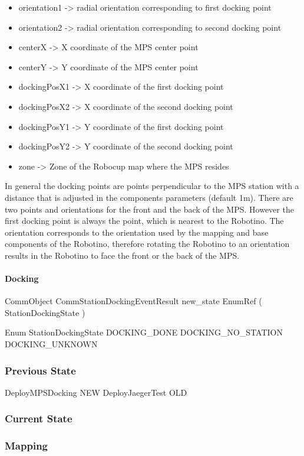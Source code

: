 \begin{itemize}
\item orientation1 -> radial orientation corresponding to first docking point
\item orientation2 -> radial orientation corresponding to second docking point
\item centerX -> X coordinate of the MPS center point
\item centerY -> Y coordinate of the MPS center point
\item dockingPosX1 -> X coordinate of the first docking point
\item dockingPosX2 -> X coordinate of the second docking point
\item dockingPosY1 -> Y coordinate of the first docking point
\item dockingPosY2 -> Y coordinate of the second docking point
\item zone -> Zone of the Robocup map where the MPS resides
\end{itemize}

In general the docking points are points perpendicular to the MPS station with a distance that is adjusted in the components parameters (default 1m). There are two points and orientations for the front and the back of the MPS. However the first docking point is always the point, which is nearest to the Robotino. The orientation corresponds to the orientation used by the mapping and base components of the Robotino, therefore rotating the Robotino to an orientation results in the Robotino to face the front or the back of the MPS.
	
\paragraph{Docking}

CommObject CommStationDockingEventResult 
new\_state  EnumRef ( StationDockingState )
		
Enum StationDockingState 
DOCKING\_DONE
DOCKING\_NO\_STATION
DOCKING\_UNKNOWN
	
\subsubsection{Previous State}
DeployMPSDocking NEW
DeployJaegerTest OLD

\subsubsection{Current State}

\subsubsection{Mapping}



